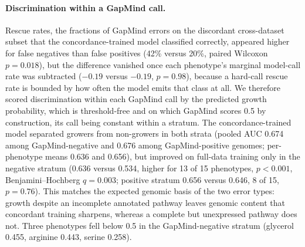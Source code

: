 \paragraph{Discrimination within a GapMind call.}
Rescue rates, the fractions of GapMind errors on the discordant cross-dataset subset that the concordance-trained model classified correctly, appeared higher for false negatives than false positives (42\% versus 20\%, paired Wilcoxon $p = 0.018$), but the difference vanished once each phenotype's marginal model-call rate was subtracted ($-0.19$ versus $-0.19$, $p = 0.98$), because a hard-call rescue rate is bounded by how often the model emits that class at all.
We therefore scored discrimination within each GapMind call by the predicted growth probability, which is threshold-free and on which GapMind scores 0.5 by construction, its call being constant within a stratum.
The concordance-trained model separated growers from non-growers in both strata (pooled AUC 0.674 among GapMind-negative and 0.676 among GapMind-positive genomes; per-phenotype means 0.636 and 0.656), but improved on full-data training only in the negative stratum (0.636 versus 0.534, higher for 13 of 15 phenotypes, $p < 0.001$, Benjamini--Hochberg $q = 0.003$; positive stratum 0.656 versus 0.646, 8 of 15, $p = 0.76$).
This matches the expected genomic basis of the two error types: growth despite an incomplete annotated pathway leaves genomic content that concordant training sharpens, whereas a complete but unexpressed pathway does not.
Three phenotypes fell below 0.5 in the GapMind-negative stratum (glycerol 0.455, arginine 0.443, serine 0.258).

